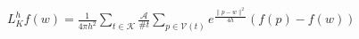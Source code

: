 \documentclass[12pt]{article}
\begin{document}
      $\displaystyle L^h_K f(w) = \frac{1}{4 \pi h^2} \sum_{t \in \mathcal{K}} 
       \frac{\mathcal{A}}{\#t}  
       \sum_{p \in \mathcal{V}(t)} e^{\frac{\|p-w\|^2}{4h}} (f(p) - f(w))$   
    
  
\end{document}
